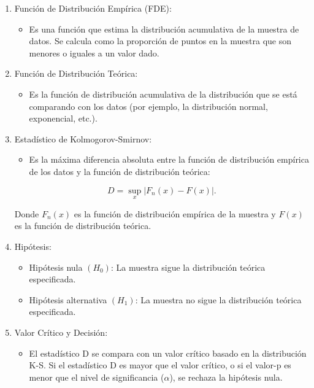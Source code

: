 \documentclass[
  us-letterpaper,
]{scrreprt}
\providecommand{\tightlist}{%
  \setlength{\itemsep}{0pt}\setlength{\parskip}{0pt}}\usepackage{longtable,booktabs,array}
\theoremstyle{plain}
\theoremstyle{plain}
\theoremstyle{definition}
\theoremstyle{remark}
\begin{document}
\begin{enumerate}
\def\labelenumi{\arabic{enumi}.}
\item
  Función de Distribución Empírica (FDE):

  \begin{itemize}
  \tightlist
  \item
    Es una función que estima la distribución acumulativa de la muestra
    de datos. Se calcula como la proporción de puntos en la muestra que
    son menores o iguales a un valor dado.
  \end{itemize}
\item
  Función de Distribución Teórica:

  \begin{itemize}
  \tightlist
  \item
    Es la función de distribución acumulativa de la distribución que se
    está comparando con los datos (por ejemplo, la distribución normal,
    exponencial, etc.).
  \end{itemize}
\item
  Estadístico de Kolmogorov-Smirnov:

  \begin{itemize}
  \tightlist
  \item
    Es la máxima diferencia absoluta entre la función de distribución
    empírica de los datos y la función de distribución teórica:
  \end{itemize}

  \[D = \sup_x |F_n(x) - F(x)|.\]

  Donde \(F_n(x)\) es la función de distribución empírica de la muestra
  y \(F(x)\) es la función de distribución teórica.
\item
  Hipótesis:

  \begin{itemize}
  \item
    Hipótesis nula \((H_0)\): La muestra sigue la distribución teórica
    especificada.
  \item
    Hipótesis alternativa \((H_1)\): La muestra no sigue la distribución
    teórica especificada.
  \end{itemize}
\item
  Valor Crítico y Decisión:

  \begin{itemize}
  \tightlist
  \item
    El estadístico D se compara con un valor crítico basado en la
    distribución K-S. Si el estadístico D es mayor que el valor crítico,
    o si el valor-p es menor que el nivel de significancia (\(\alpha\)),
    se rechaza la hipótesis nula.
  \end{itemize}
\end{enumerate}
\end{document}
